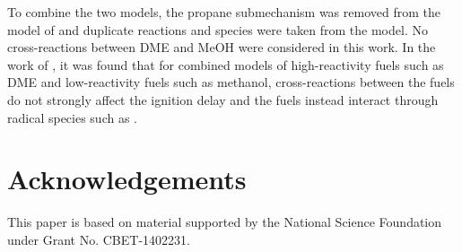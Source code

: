 \documentclass[12pt]{../ussci}
\begin{document}
To combine the two models, the propane submechanism was removed from the model
of \textcite{Dames2016} and duplicate reactions and species were taken from the
\textcite{Dames2016} model. No cross-reactions between DME and MeOH were
considered in this work. In the work of \textcite{Dames2016}, it was found that
for combined models of high-reactivity fuels such as DME and low-reactivity
fuels such as methanol, cross-reactions between the fuels do not strongly affect
the ignition delay and the fuels instead interact through radical species such
as .

\section{Acknowledgements}\label{acknowledgements}

This paper is based on material supported by the National Science
Foundation under Grant No. CBET-1402231.

\printbibliography
\end{document}
